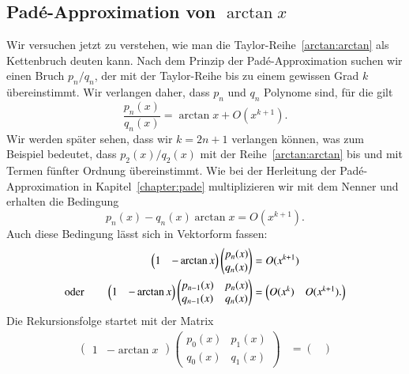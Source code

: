 \begin{refsection}
\section{Padé-Approximation von $\arctan x$
\label{arctan:section:kettenbruch}}
Wir versuchen jetzt zu verstehen, wie man die Taylor-Reihe~\ref{arctan:arctan}
als Kettenbruch deuten kann.
Nach dem Prinzip der Padé-Approximation suchen wir einen Bruch $p_n/q_n$,
der mit der Taylor-Reihe bis zu einem gewissen Grad $k$ übereinstimmt.
Wir verlangen daher, dass $p_n$ und $q_n$ Polynome sind, für die gilt
\[
\frac{p_n(x)}{q_n(x)} = \arctan x + O(x^{k+1}).
\]
Wir werden später sehen, dass wir $k=2n+1$ verlangen können, was zum
Beispiel bedeutet, dass $p_2(x)/q_2(x)$ mit der Reihe~\ref{arctan:arctan}
bis und mit Termen fünfter Ordnung übereinstimmt.
Wie bei der Herleitung der Padé-Approximation in Kapitel~\ref{chapter:pade}
multiplizieren wir mit dem Nenner und erhalten die Bedingung
\begin{equation}
p_n(x) - q_n(x)\arctan x = O(x^{k+1}).
\label{arctan:bedingung}
\end{equation}
Auch diese Bedingung lässt sich in Vektorform fassen:
\begin{align}
\begin{pmatrix}
1&-\arctan x
\end{pmatrix}
\begin{pmatrix} 
p_n(x)\\q_n(x)
\end{pmatrix}
&=
O(x^{k+1})
\notag
\\
\text{oder}\qquad
\begin{pmatrix}
1&-\arctan x
\end{pmatrix}
\begin{pmatrix}
p_{n-1}(x)&p_n(x)\\
q_{n-1}(x)&q_n(x)
\end{pmatrix}
&=
\begin{pmatrix}
O(x^{k})&O(x^{k+1}).
\end{pmatrix}
\label{arctan:bedingungmatrix}
\end{align}
Die Rekursionsfolge startet mit der Matrix
\begin{align*}
\begin{pmatrix}
1&-\arctan x
\end{pmatrix}
\begin{pmatrix}
p_0(x)&p_1(x)\\
q_0(x)&q_1(x)
\end{pmatrix}
&=
\begin{pmatrix}

\end{pmatrix}
\end{align*}
\end{refsection}
